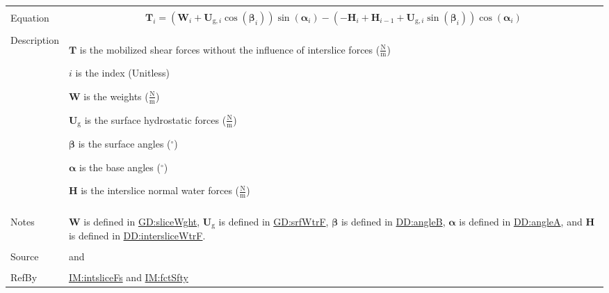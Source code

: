 \documentclass[12pt]{article}
\begin{document}
\begin{minipage}{\textwidth}
\begin{tabular}{>{\raggedright}p{}>{\raggedright\arraybackslash}p{}}
\\ \midrule \\
Equation & \begin{displaymath}
           {\symbf{T}}_{i}=\left({\symbf{W}}_{i}+{\symbf{U}_{\text{g},i}} \cos\left({\symbf{β}}_{i}\right)\right) \sin\left({\symbf{α}}_{i}\right)-\left(-{\symbf{H}}_{i}+{\symbf{H}}_{i-1}+{\symbf{U}_{\text{g},i}} \sin\left({\symbf{β}}_{i}\right)\right) \cos\left({\symbf{α}}_{i}\right)
           \end{displaymath}
\\ \midrule \\
Description & \begin{symbDescription}
              \item{$\symbf{T}$ is the mobilized shear forces without the influence of interslice forces ($\frac{\text{N}}{\text{m}}$)}
              \item{$i$ is the index (Unitless)}
              \item{$\symbf{W}$ is the weights ($\frac{\text{N}}{\text{m}}$)}
              \item{${\symbf{U}_{\text{g}}}$ is the surface hydrostatic forces ($\frac{\text{N}}{\text{m}}$)}
              \item{$\symbf{β}$ is the surface angles (${{}^{\circ}}$)}
              \item{$\symbf{α}$ is the base angles (${{}^{\circ}}$)}
              \item{$\symbf{H}$ is the interslice normal water forces ($\frac{\text{N}}{\text{m}}$)}
              \end{symbDescription}
\\ \midrule \\
Notes & $\symbf{W}$ is defined in \hyperref[GD:sliceWght]{GD:sliceWght}, ${\symbf{U}_{\text{g}}}$ is defined in \hyperref[GD:srfWtrF]{GD:srfWtrF}, $\symbf{β}$ is defined in \hyperref[DD:angleB]{DD:angleB}, $\symbf{α}$ is defined in \hyperref[DD:angleA]{DD:angleA}, and $\symbf{H}$ is defined in \hyperref[DD:intersliceWtrF]{DD:intersliceWtrF}.
        
\\ \midrule \\
Source & \cite{chen2005} and \cite{karchewski2012}
         
\\ \midrule \\
RefBy & \hyperref[IM:intsliceFs]{IM:intsliceFs} and \hyperref[IM:fctSfty]{IM:fctSfty}
        
\\ \bottomrule
\end{tabular}
\end{minipage}
\end{document}

